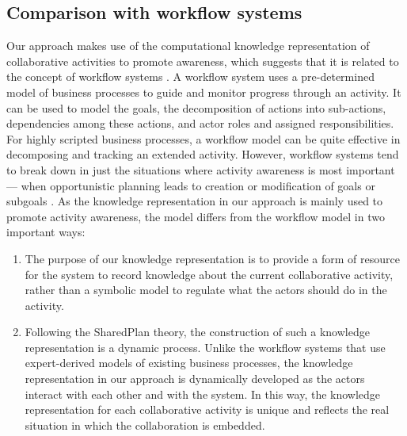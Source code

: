 \subsection{Comparison with workflow systems} %
\label{sub:comparison_with_workflow_systems}
Our approach makes use of the computational knowledge representation of collaborative activities to promote awareness, which suggests that it is related to the concept of workflow systems \cite{Jansen2010,attie1996scheduling}. A workflow system uses a pre-determined model of business processes to guide and monitor progress through an activity. It can be used to model the goals, the decomposition of actions into sub-actions, dependencies among these actions, and actor roles and assigned responsibilities. For highly scripted business processes, a workflow model can be quite effective in decomposing and tracking an extended activity. However, workflow systems tend to break down in just the situations where activity awareness is most important — when opportunistic planning leads to creation or modification of goals or subgoals \cite{carroll2003a}. As the knowledge representation in our approach is mainly used to promote activity awareness, the model differs from the workflow model in two important ways:

\begin{enumerate}
	\item The purpose of our knowledge representation is to provide a form of resource for the system to record knowledge about the current collaborative activity, rather than a symbolic model to regulate what the actors should do in the activity.
	\item Following the SharedPlan theory, the construction of such a knowledge representation is a dynamic process. Unlike the workflow systems that use expert-derived models of existing business processes, the knowledge representation in our approach is dynamically developed as the actors interact with each other and with the system. In this way, the knowledge representation for each collaborative activity is unique and reflects the real situation in which the collaboration is embedded.
\end{enumerate}
